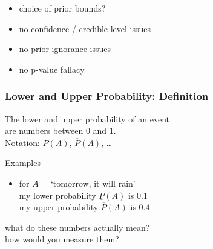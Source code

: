 \documentclass{beamer}
\newcommand{\lpr}{\underline{P}}
\newcommand{\upr}{\overline{P}}
\newcommand{\gplus}{\structure{\textbf{+}}}
\newcommand{\gmins}{\structure{\textbf{--}}}
\begin{document}
\begin{frame}
  \vspace*{1ex}
\pause
{}
    \begin{itemize}
  \setlength{\itemsep}{0pt}
  \setlength{\parskip}{0pt}
  \setlength{\parsep}{0pt}
    \item[\gmins] choice of prior bounds?
    \item[\gplus] no confidence / credible level issues
    \item[\gplus] no prior ignorance issues
    \item[\gplus] no p-value fallacy
    \end{itemize}
\end{frame}

\begin{frame}
  \frametitle{Lower and Upper Probability: Definition}
  \begin{definition}
    The \alert{lower and upper probability of an event}\\ are numbers between $0$ and $1$.
    \\[1ex]
    Notation: $\lpr(A)$, $\upr(A)$, \dots
  \end{definition}
  \begin{exampleblock}{Examples}
    \begin{itemize}
    \item for $A$ = `tomorrow, it will rain' \\
      my lower probability $\lpr(A)$ is $0.1$ \\
      my upper probability $\upr(A)$ is $0.4$
    \end{itemize}
  \end{exampleblock}
\pause
  \begin{alertblock}{}
    what do these numbers actually mean? \\
    how would you measure them?
  \end{alertblock}
\end{frame}
\end{document}
